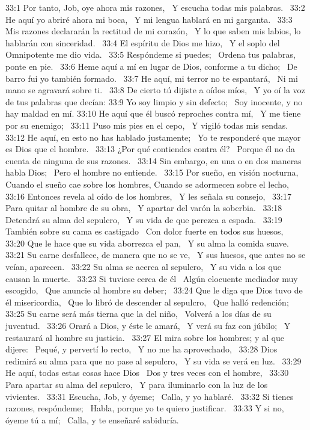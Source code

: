 33:1 Por tanto, Job, oye ahora mis razones,  
Y escucha todas mis palabras.  
33:2 He aquí yo abriré ahora mi boca,  
Y mi lengua hablará en mi garganta.  
33:3 Mis razones declararán la rectitud de mi corazón,  
Y lo que saben mis labios, lo hablarán con sinceridad.  
33:4 El espíritu de Dios me hizo,  
Y el soplo del Omnipotente me dio vida.  
33:5 Respóndeme si puedes;  
Ordena tus palabras, ponte en pie.  
33:6 Heme aquí a mí en lugar de Dios, conforme a tu dicho;  
De barro fui yo también formado.  
33:7 He aquí, mi terror no te espantará,  
Ni mi mano se agravará sobre ti.  
33:8 De cierto tú dijiste a oídos míos,  
Y yo oí la voz de tus palabras que decían: 
33:9 Yo soy limpio y sin defecto;  
Soy inocente, y no hay maldad en mí. 
33:10 He aquí que él buscó reproches contra mí,  
Y me tiene por su enemigo;  
33:11 Puso mis pies en el cepo,  
Y vigiló todas mis sendas.  
33:12 He aquí, en esto no has hablado justamente;  
Yo te responderé que mayor es Dios que el hombre.  
33:13 ¿Por qué contiendes contra él?  
Porque él no da cuenta de ninguna de sus razones.  
33:14 Sin embargo, en una o en dos maneras habla Dios;  
Pero el hombre no entiende.  
33:15 Por sueño, en visión nocturna,  
Cuando el sueño cae sobre los hombres, 
Cuando se adormecen sobre el lecho, 
33:16 Entonces revela al oído de los hombres,  
Y les señala su consejo,  
33:17 Para quitar al hombre de su obra,  
Y apartar del varón la soberbia.  
33:18 Detendrá su alma del sepulcro,  
Y su vida de que perezca a espada.  
33:19 También sobre su cama es castigado  
Con dolor fuerte en todos sus huesos,  
33:20 Que le hace que su vida aborrezca el pan,  
Y su alma la comida suave.  
33:21 Su carne desfallece, de manera que no se ve,  
Y sus huesos, que antes no se veían, aparecen.  
33:22 Su alma se acerca al sepulcro,  
Y su vida a los que causan la muerte.  
33:23 Si tuviese cerca de él  
Algún elocuente mediador muy escogido,  
Que anuncie al hombre su deber;  
33:24 Que le diga que Dios tuvo de él misericordia,  
Que lo libró de descender al sepulcro,  
Que halló redención;  
33:25 Su carne será más tierna que la del niño,  
Volverá a los días de su juventud.  
33:26 Orará a Dios, y éste le amará,  
Y verá su faz con júbilo;  
Y restaurará al hombre su justicia.  
33:27 El mira sobre los hombres; y al que dijere:  
Pequé, y pervertí lo recto,  
Y no me ha aprovechado,  
33:28 Dios redimirá su alma para que no pase al sepulcro,  
Y su vida se verá en luz.  
33:29 He aquí, todas estas cosas hace Dios  
Dos y tres veces con el hombre,  
33:30 Para apartar su alma del sepulcro,  
Y para iluminarlo con la luz de los vivientes.  
33:31 Escucha, Job, y óyeme;  
Calla, y yo hablaré.  
33:32 Si tienes razones, respóndeme;  
Habla, porque yo te quiero justificar.  
33:33 Y si no, óyeme tú a mí;  
Calla, y te enseñaré sabiduría. 
